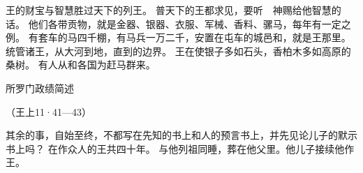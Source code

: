 {\par }{\PP {}王的财宝与智慧胜过天下的列王。
普天下的王都求见{}，要听　神赐给他智慧的话。
他们各带贡物，就是金器、银器、衣服、军械、香料、骡马，每年有一定之例。
有套车的马四千棚，有马兵一万二千，安置在屯车的城邑和{}，就是王那里。
统管诸王，从大河到{}地，直到{}的边界。
王在{}使银子多如石头，香柏木多如高原的桑树。
有人从{}和各国为{}赶马群来。
\par }{\SH 所罗门政绩简述
\par }{\R （王上11·41—43）
\par }{\PP {}其余的事，自始至终，不都写在先知{}的书上和{}人{}的预言书上，并先见{}论{}儿子{}的默示书上吗？
在{}作{}众人的王共四十年。
与他列祖同睡，葬在他父{}里。他儿子{}接续他作王。

}
